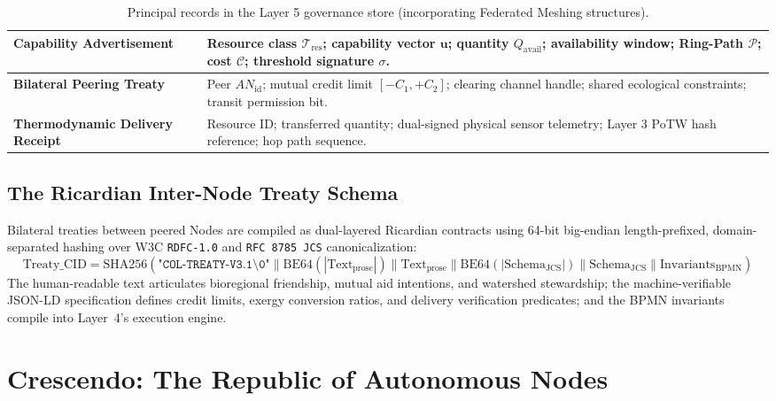 \begin{table}[htbp]
\begin{tabular}{|p{}|p{}|}
\textbf{Capability Advertisement} & Resource class $\mathcal{T}_{\mathrm{res}}$; capability vector $\mathbf{u}$; quantity $Q_{\mathrm{avail}}$; availability window; Ring-Path $\mathcal{P}$; cost $\mathcal{C}$; threshold signature $\sigma$. \\
\hline
\textbf{Bilateral Peering Treaty} & Peer $AN_{\mathrm{id}}$; mutual credit limit $[-C_1, +C_2]$; clearing channel handle; shared ecological constraints; transit permission bit. \\
\hline
\textbf{Thermodynamic Delivery Receipt} & Resource ID; transferred quantity; dual-signed physical sensor telemetry; Layer 3 PoTW hash reference; hop path sequence. \\
\hline
\end{tabular}
\caption{Principal records in the Layer 5 governance store (incorporating Federated Meshing structures).}
\label{tab:l5-records}
\end{table}

\subsection{The Ricardian Inter-Node Treaty Schema}

Bilateral treaties between peered Nodes are compiled as dual-layered Ricardian contracts \parencite{grigg2004} using 64-bit big-endian length-prefixed, domain-separated hashing over W3C \texttt{RDFC-1.0} and \texttt{RFC 8785 JCS} canonicalization:
\begin{equation}
\mathrm{Treaty\_CID} = \mathrm{SHA256}\left( \texttt{"COL-TREATY-V3.1\textbackslash0"} \parallel \mathrm{BE64}(|\mathrm{Text}_{\mathrm{prose}}|) \parallel \mathrm{Text}_{\mathrm{prose}} \parallel \mathrm{BE64}(|\mathrm{Schema}_{\mathrm{JCS}}|) \parallel \mathrm{Schema}_{\mathrm{JCS}} \parallel \mathrm{Invariants}_{\mathrm{BPMN}} \right)
\label{eq:treaty_hash}
\end{equation}
The human-readable text articulates bioregional friendship, mutual aid intentions, and watershed stewardship; the machine-verifiable JSON-LD specification defines credit limits, exergy conversion ratios, and delivery verification predicates; and the BPMN invariants compile into Layer~4's execution engine.

\section{Crescendo: The Republic of Autonomous Nodes}
\label{sec:l5-crescendo}

